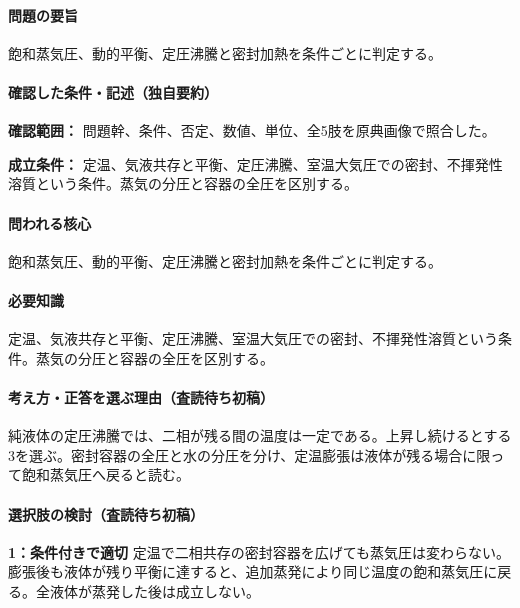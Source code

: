 \paragraph{問題の要旨} 飽和蒸気圧、動的平衡、定圧沸騰と密封加熱を条件ごとに判定する。

\paragraph{確認した条件・記述（独自要約）}\mbox{}\par

\noindent\textbf{確認範囲：} 問題幹、条件、否定、数値、単位、全5肢を原典画像で照合した。\par

\noindent\textbf{成立条件：} 定温、気液共存と平衡、定圧沸騰、室温大気圧での密封、不揮発性溶質という条件。蒸気の分圧と容器の全圧を区別する。\par

\paragraph{問われる核心} 飽和蒸気圧、動的平衡、定圧沸騰と密封加熱を条件ごとに判定する。

\paragraph{必要知識} 定温、気液共存と平衡、定圧沸騰、室温大気圧での密封、不揮発性溶質という条件。蒸気の分圧と容器の全圧を区別する。

\paragraph{考え方・正答を選ぶ理由（査読待ち初稿）} 純液体の定圧沸騰では、二相が残る間の温度は一定である。上昇し続けるとする3を選ぶ。密封容器の全圧と水の分圧を分け、定温膨張は液体が残る場合に限って飽和蒸気圧へ戻ると読む。

\paragraph{選択肢の検討（査読待ち初稿）}\mbox{}\par

\noindent\textbf{1：条件付きで適切} 定温で二相共存の密封容器を広げても蒸気圧は変わらない。膨張後も液体が残り平衡に達すると、追加蒸発により同じ温度の飽和蒸気圧に戻る。全液体が蒸発した後は成立しない。\par

